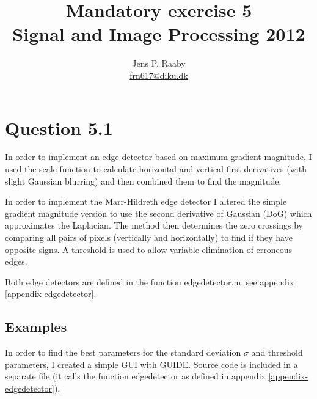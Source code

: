 \documentclass[a4paper]{article}
\title{Mandatory exercise 5 \\
Signal and Image Processing 2012}
\author{Jens P. Raaby \\
\url{frn617@diku.dk}}
\begin{document}
 
\maketitle

\section*{Question 5.1}
In order to implement an edge detector based on maximum gradient magnitude, I used the scale function to calculate horizontal and vertical first derivatives (with slight Gaussian blurring) and then combined them to find the magnitude.

In order to implement the Marr-Hildreth edge detector I altered the simple gradient magnitude version to use the second derivative of Gaussian (DoG) which approximates the Laplacian. The method then determines the zero crossings by comparing all pairs of pixels (vertically and horizontally) to find if they have opposite signs. A threshold is used to allow variable elimination of erroneous edges. 

Both edge detectors are defined in the function edgedetector.m, see appendix \ref{appendix-edgedetector}.

\subsection*{Examples}
In order to find the best parameters for the standard deviation $\sigma$ and threshold parameters, I created a simple GUI with GUIDE. Source code is included in a separate file (it calls the function edgedetector as defined in appendix \ref{appendix-edgedetector}).
\end{document}
